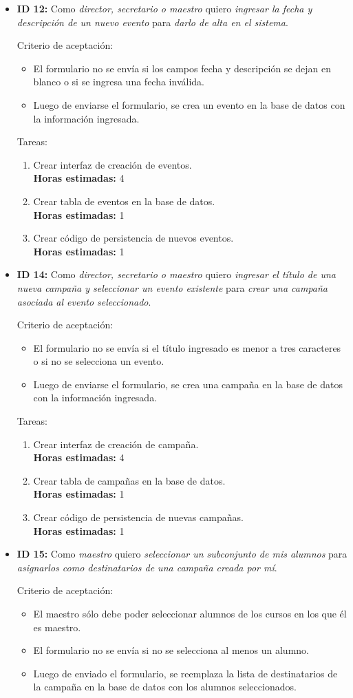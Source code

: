 \documentclass[a4paper, 10pt, twoside]{article}
\newenvironment{stories}{
  \begin{itemize}
}{
  \end{itemize}
}
\newcommand{\storyid}[4]{
  \item
  \textbf{ID #1:} Como \emph{#2} quiero \emph{#3} para \emph{#4}.
}
\newenvironment{tasks}{
  Tareas:
  \begin{enumerate}
}{
  \end{enumerate}
}
\newcommand{\task}[1] {
  \item #1.\\
  \textbf{Horas estimadas:}
}
\newenvironment{criterios}{
  Criterio de aceptación:
  \begin{itemize}
}{
  \end{itemize}
}
\newcommand{\criteria}[1] {
  \item #1
}
\begin{document}
\begin{stories}
  \storyid{12}
          {director, secretario o maestro}
          {ingresar la fecha y descripción de un nuevo evento}
          {darlo de alta en el sistema}

   \begin{criterios}
    \criteria{El formulario no se envía si los campos fecha y descripción se dejan en blanco o si se ingresa una fecha inválida.}
    \criteria{Luego de enviarse el formulario, se crea un evento en la base de datos con la información ingresada.}
  \end{criterios}

  \begin{tasks}
    \task{Crear interfaz de creación de eventos} 4
    \task{Crear tabla de eventos en la base de datos} 1
    \task{Crear código de persistencia de nuevos eventos} 1
  \end{tasks}


  \storyid{14}
          {director, secretario o maestro}
          {ingresar el título de una nueva campaña y seleccionar un evento existente}
          {crear una campaña asociada al evento seleccionado}

   \begin{criterios}
     \criteria{El formulario no se envía si el título ingresado es menor a tres caracteres o si no se selecciona un evento.}
     \criteria{Luego de enviarse el formulario, se crea una campaña en la base de datos con la información ingresada.}
  \end{criterios}

  \begin{tasks}
    \task{Crear interfaz de creación de campaña} 4
    \task{Crear tabla de campañas en la base de datos} 1
    \task{Crear código de persistencia de nuevas campañas} 1
  \end{tasks}


  \storyid{15}
          {maestro}
          {seleccionar un subconjunto de mis alumnos}
          {asignarlos como destinatarios de una campaña creada por mí}

   \begin{criterios}
    \criteria{El maestro sólo debe poder seleccionar alumnos de los cursos en los que él es maestro.}
    \criteria{El formulario no se envía si no se selecciona al menos un alumno.}
    \criteria{Luego de enviado el formulario, se reemplaza la lista de destinatarios de la campaña en la base de datos con los alumnos seleccionados.}
  \end{criterios}


\end{stories}
\end{document}
